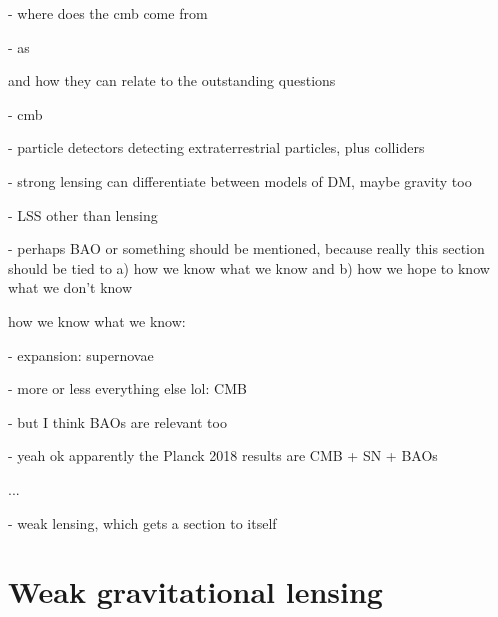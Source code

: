 \documentclass{scrbook}
\begin{document}
- where does the cmb come from

- as

and how they can relate to the outstanding questions

- cmb

- particle detectors detecting extraterrestrial particles, plus colliders

- strong lensing can differentiate between models of DM, maybe gravity too

- LSS other than lensing

- perhaps BAO or something should be mentioned, because really this section should be tied to a) how we know what we know and b) how we hope to know what we don't know

how we know what we know:

- expansion: supernovae

- more or less everything else lol: CMB

- but I think BAOs are relevant too

- yeah ok apparently the Planck 2018 results are CMB + SN + BAOs

...

- weak lensing, which gets a section to itself

\section{Weak gravitational lensing}


\printbibliography[heading=bibintoc]
\end{document}
